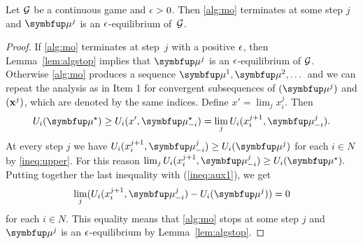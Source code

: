 \begin{theorem}\label{thm:convergence2}
	Let $\mathcal{G}$ be a continuous game and $\epsilon>0$. Then \cref{alg:mo} terminates at some step $j$ and $\bmu^j$ is an $\epsilon$-equilibrium of~$\mathcal{G}$.
\end{theorem}
\begin{proof}
	If \cref{alg:mo} terminates at step~$j$ with a positive $\epsilon$, then Lemma~\ref{lem:algstop} implies that $\bmu^j$ is an $\epsilon$-equilibrium of $\mathcal{G}$. Otherwise \cref{alg:mo} produces a sequence $\bmu^1,\bmu^2,\dots$ and we can repeat the analysis as in Item 1 for  convergent subsequences of $(\bmu^j)$ and $(\mathbf{x}^j)$, which are denoted by the same indices. Define $x'= \lim_j x_i^j.$ Then
	\begin{equation}\label{ineq:aux1}
	U_i(\bmu^\star)\ge U_i(x',\bmu_{-i}^\star)= \lim_{j} U_i(x_{i}^{j+1},\bmu_{-i}^j).
	\end{equation}
	At every step $j$ we have $U_i(x_i^{j+1},\bmu^j_{-i})\geq U_i(\bmu^j)$ for each $i\in N$ by \eqref{ineq:upper}. For this reason $\lim_{j} U_i(x_{i}^{j+1},\bmu_{-i}^j) \geq  U_i(\bmu^\star).$ Putting together the last inequality with (\ref{ineq:aux1}), we get
	\begin{equation}\label{eq:limiting}
	\lim_{j} (U_i(x_{i}^{j+1},\bmu_{-i}^j)-U_i(\bmu^j)) = 0
	\end{equation}
	for each $i\in N$. This equality means that \cref{alg:mo} stops at some step $j$ and $\bmu^j$ is an $\epsilon$-equilibrium by Lemma~\ref{lem:algstop}.
\end{proof}

